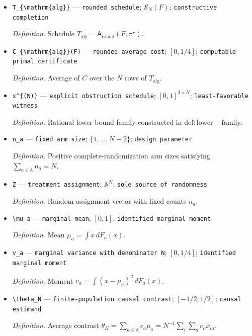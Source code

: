\documentclass{article}
\begin{document}
\begin{itemize}
  \item \texttt{T\_\allowbreak{}\{\textbackslash{}\allowbreak{}mathrm\{alg\}\allowbreak{}\}\allowbreak{}} --- \texttt{rounded schedule}; \(\mathcal S_N(F)\); \texttt{constructive completion}
  \par\smallskip\noindent\emph{Definition.} Schedule \(T_{\mathrm{alg}}=\mathsf A_{\mathrm{round}}(F,\pi^\star)\).
  \item \texttt{C\_\allowbreak{}\{\textbackslash{}\allowbreak{}mathrm\{alg\}\allowbreak{}\}\allowbreak{}(F)} --- \texttt{rounded average cost}; \([0,1/4]\); \texttt{computable primal certificate}
  \par\smallskip\noindent\emph{Definition.} Average of \(C\) over the \(N\) rows of \(T_{\mathrm{alg}}\).
  \item \texttt{x\textasciicircum{}\{(N)\}\allowbreak{}} --- \texttt{explicit obstruction schedule}; \([0,1]^{3\times N}\); \texttt{least-\allowbreak{}favorable witness}
  \par\smallskip\noindent\emph{Definition.} Rational lower-bound family constructed in \(\mathrm{def:lower-family}\).
  \item \texttt{n\_\allowbreak{}a} --- \texttt{fixed arm size}; \(\{1,\ldots,N-2\}\); \texttt{design parameter}
  \par\smallskip\noindent\emph{Definition.} Positive complete-randomization arm sizes satisfying \(\sum_{a\in\mathbb A}n_a=N\).
  \item \texttt{Z} --- \texttt{treatment assignment}; \(\mathbb A^N\); \texttt{sole source of randomness}
  \par\smallskip\noindent\emph{Definition.} Random assignment vector with fixed counts \(n_a\).
  \item \texttt{\textbackslash{}\allowbreak{}mu\_\allowbreak{}a} --- \texttt{marginal mean}; \([0,1]\); \texttt{identified marginal moment}
  \par\smallskip\noindent\emph{Definition.} Mean \(\mu_a=\int x\,dF_a(x)\).
  \item \texttt{v\_\allowbreak{}a} --- \texttt{marginal variance with denominator N}; \([0,1/4]\); \texttt{identified marginal moment}
  \par\smallskip\noindent\emph{Definition.} Moment \(v_a=\int(x-\mu_a)^2\,dF_a(x)\).
  \item \texttt{\textbackslash{}\allowbreak{}theta\_\allowbreak{}N} --- \texttt{finite-\allowbreak{}population causal contrast}; \([-1/2,1/2]\); \texttt{causal estimand}
  \par\smallskip\noindent\emph{Definition.} Average contrast \(\theta_N=\sum_{a\in\mathbb A}c_a\mu_a=N^{-1}\sum_i\sum_a c_ax_{ai}\).

\end{itemize}
\end{document}
